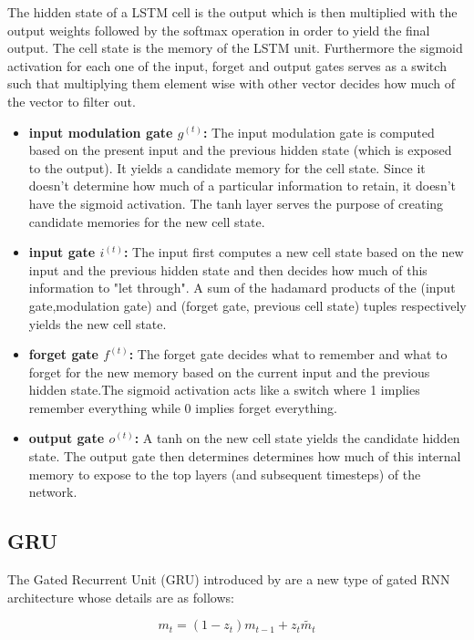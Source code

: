 The hidden state of a LSTM cell is the output which is then multiplied with the output weights followed by the softmax operation in order to yield the final output. The cell state is the memory of the LSTM unit. Furthermore the sigmoid activation for each one of the input, forget and output gates serves as a switch such that multiplying them element wise with other vector decides how much of the vector to filter out.
\begin{itemize}
	\item \textbf{input modulation gate $g^{(t)}$:} The input modulation gate is computed based on the present input and the previous hidden state (which is exposed to the output). It yields a candidate memory for the cell state. Since it doesn't determine how much of a particular information to retain, it doesn't have the sigmoid activation. The tanh layer serves the purpose of creating candidate memories for the new cell state.
	\item \textbf{input gate $i^{(t)}$:} The input first computes a new cell state based on the new input and the previous hidden state and then decides how much of this information to "let through". A sum of the hadamard products of the (input gate,modulation gate) and (forget gate, previous cell state) tuples respectively yields the new cell state.
	\item \textbf{forget gate $f^{(t)}$:} The forget gate decides what to remember and what to forget for the new memory based on the current input and the previous hidden state.The sigmoid activation acts like a switch where 1 implies remember everything while 0 implies forget everything.
	\item \textbf{output gate $o^{(t)}$:} A tanh on the new cell state yields the candidate hidden state. The output gate then determines determines how much of this internal memory to expose to the top layers (and subsequent timesteps) of the network.
\end{itemize}

\subsection{GRU}
The Gated Recurrent Unit (GRU) introduced by \cite{GRU} are a new type of gated RNN architecture whose details are as follows:

\begin{equation}
m_t= (1-z_t)m_{t-1} + z_t\widetilde{m_t} %
\end{equation}


